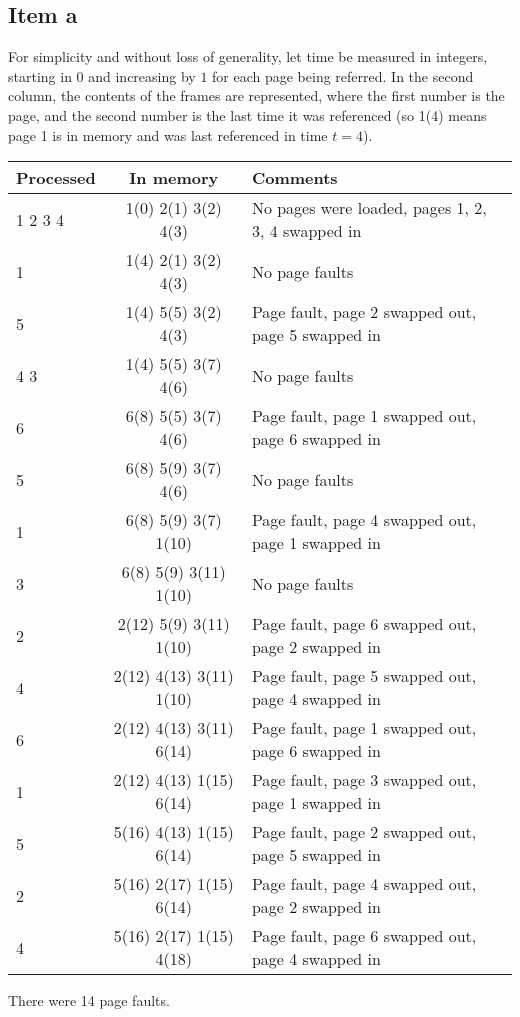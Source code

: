 {\subsection{Item a}
For simplicity and without loss of generality, let time be measured in integers, starting in $0$ and increasing by $1$ for each page being referred. In the second column, the contents of the frames are represented, where the first number is the page, and the second number is the last time it was referenced (so 1(4) means page 1 is in memory and was last referenced in time $t=4$).
\begin{center}
\begin{tabular}{l | c | l}
    \textbf{Processed} & \textbf{In memory} & \textbf{Comments} \\ \hline
    1 2 3 4            & 1(0) 2(1) 3(2) 4(3)     & No pages were loaded, pages 1, 2, 3, 4 swapped in \\
    1                  & 1(4) 2(1) 3(2) 4(3)     & No page faults \\
    5                  & 1(4) 5(5) 3(2) 4(3)     & Page fault, page 2 swapped out, page 5 swapped in \\
    4 3                & 1(4) 5(5) 3(7) 4(6)     & No page faults \\
    6                  & 6(8) 5(5) 3(7) 4(6)     & Page fault, page 1 swapped out, page 6 swapped in \\
    5                  & 6(8) 5(9) 3(7) 4(6)     & No page faults \\
    1                  & 6(8) 5(9) 3(7) 1(10)    & Page fault, page 4 swapped out, page 1 swapped in \\
    3                  & 6(8) 5(9) 3(11) 1(10)   & No page faults \\
    2                  & 2(12) 5(9) 3(11) 1(10)  & Page fault, page 6 swapped out, page 2 swapped in \\
    4                  & 2(12) 4(13) 3(11) 1(10) & Page fault, page 5 swapped out, page 4 swapped in \\
    6                  & 2(12) 4(13) 3(11) 6(14) & Page fault, page 1 swapped out, page 6 swapped in \\
    1                  & 2(12) 4(13) 1(15) 6(14) & Page fault, page 3 swapped out, page 1 swapped in \\
    5                  & 5(16) 4(13) 1(15) 6(14) & Page fault, page 2 swapped out, page 5 swapped in \\
    2                  & 5(16) 2(17) 1(15) 6(14) & Page fault, page 4 swapped out, page 2 swapped in \\
    4                  & 5(16) 2(17) 1(15) 4(18) & Page fault, page 6 swapped out, page 4 swapped in
\end{tabular}
\end{center}
There were 14 page faults.

}
